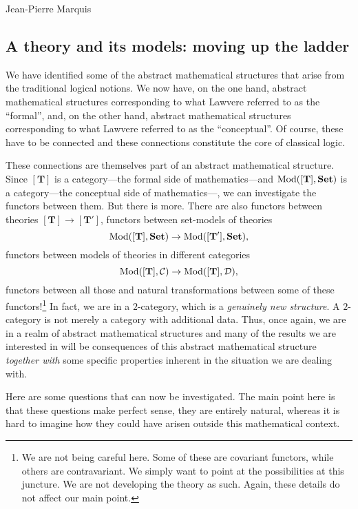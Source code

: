 \begin{artengenv}{Jean-Pierre Marquis}
\subsection{A theory and its models: moving up the ladder}

We have identified some of the abstract mathematical structures that arise from the traditional logical notions. We now have, on the one hand, abstract mathematical structures corresponding to what Lawvere referred to as the ``formal'', and, on the other hand, abstract mathematical structures corresponding to what Lawvere referred to as the ``conceptual''. Of course, these have to be connected and these connections constitute the core of classical logic. 

These connections are themselves part of an abstract mathematical structure. Since \( [\mathbf{T}] \) is a category---the formal side of mathematics---and  \( \operatorname{\mathrm{Mod}}([\mathbf{T}], \mathbf{Set}) \) is a category---the conceptual side of mathematics---, we can investigate the functors between them. But there is more. There are also functors between theories \( [\mathbf{T}] \to [\mathbf{T'}] \), functors between set-models of theories 
\[ \operatorname{\mathrm{Mod}}([\mathbf{T}], \mathbf{Set}) \to \operatorname{\mathrm{Mod}}([\mathbf{T'}], \mathbf{Set}), \] 
functors between models of theories in different categories 
\[ \operatorname{\mathrm{Mod}}([\mathbf{T}], \mathcal{C}) \to \operatorname{\mathrm{Mod}}([\mathbf{T}], \mathcal{D}), \]
 functors between all those and natural transformations between some of these functors!\footnote{We are not being careful here. Some of these are covariant functors, while others are contravariant. We simply want to point at the possibilities at this juncture. We are not developing the theory as such. Again, these details do not affect our main point.}
 In fact, we are in a $2$-category, which is a \emph{genuinely new structure}.  A $2$-category is not merely a category with additional data. Thus, once again, we are in a realm of abstract mathematical structures and many of the results we are interested in will be consequences of this abstract mathematical structure \emph{together with} some specific properties inherent in the situation we are dealing with.

Here are some questions that can now be investigated. The main point here is that these questions make perfect sense, they are entirely natural, whereas it is hard to imagine how they could have arisen outside this mathematical context.

 
%
\begin{enumerate}


\end{enumerate}
\end{artengenv}
